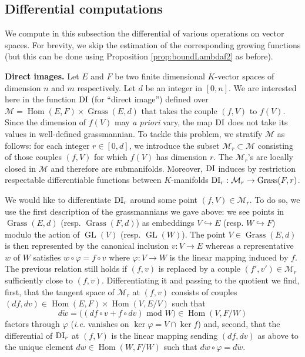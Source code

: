 \documentclass{sig-alternate}
\DeclareMathOperator{\Hom}{Hom}
\DeclareMathOperator{\GL}{GL}
\DeclareMathOperator{\Grass}{Grass}
\begin{document}
\subsection{Differential computations}

We compute in this subsection the differential of various operations on 
vector spaces. For brevity, we skip the estimation of the corresponding 
growing functions (but this can be done using Proposition 
\ref{prop:boundLambdaf2} as before).

\medskip

\noindent
{\bf Direct images.}
Let $E$ and $F$ be two finite dimensional $K$-vector spaces of dimension 
$n$ and $m$ respectively. Let $d$ be an integer in $[0,n]$. We are
interested here in the function $\text{\rm DI}$ (for ``direct image'') defined 
over $\mathcal M = \Hom(E,F) \times \Grass(E,d)$ that takes the 
couple $(f,V)$ to $f(V)$. Since the dimension of $f(V)$ may \emph{a 
priori} vary, the map $\text{\rm DI}$ does not take its values in well-defined 
grassmannian. To tackle this problem, we stratify $\mathcal M$ as
follows: for each integer $r \in [0,d]$, we introduce the subset
$\mathcal M_r \subset \mathcal M$ consisting of those couples $(f,V)$
for which $f(V)$ has dimension $r$. The $\mathcal M_r$'s are
locally closed in $\mathcal M$ and therefore are submanifolds. 
Moreover, $\text{\rm DI}$ induces by restriction respectable differentiable 
functions between $K$-manifolds
$\DI_r : \mathcal M_r \to \Grass(F,r)$.

We would like to differentiate $\text{\rm DI}_r$ around some point $(f,V) \in 
\mathcal M_r$. To do so, we use the first description of the 
grassmannians we gave above: we see points in $\Grass(E,d)$ 
(resp. $\Grass(F,d)$) as embeddings $V \hookrightarrow E$ (resp. $W 
\hookrightarrow F$) modulo the action of $\GL(V)$ (resp. $\GL(W)$).
The point $V \in \Grass(E,d)$ is then represented by the canonical 
inclusion $v : V \to E$ whereas a representative $w$ of $W$ satisfies
$w \circ \varphi = f \circ v$
where $\varphi : V \to W$ is the linear mapping induced by $f$. The 
previous relation still holds if $(f,v)$ is replaced by a couple $(f', 
v') \in \mathcal M_r$ sufficiently close to $(f,v)$.
Differentiating it and passing to the quotient we find, first, that the 
tangent space of $\mathcal M_r$ at $(f,v)$ consists of couples $(df, dv) 
\in \Hom(E,F) \times \Hom(V,E/V)$ such that
$$d\tilde w = \big((df \circ v + f \circ dv) \text{ mod } W\big)
\in \Hom(V, F/W)$$
factors through $\varphi$ (\emph{i.e.} vanishes on $\ker \varphi = V 
\cap \ker f$) and, second, that the differential of $\text{\rm DI}_r$ at $(f,V)$ 
is the linear mapping sending $(df,dv)$ as above to the unique element 
$dw \in \Hom(W,F/W)$ such that $dw \circ \varphi = d \tilde w$.
\end{document}
